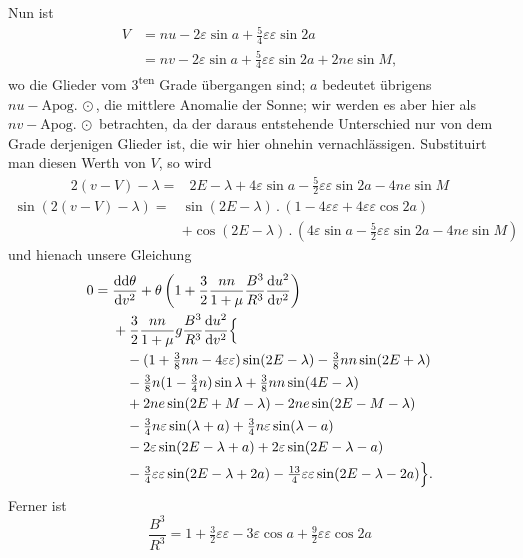 \par\noindent\hspace*{\parindent}Nun ist
\[
\begin{aligned}
V&=nu-2\varepsilon\sin a+\tfrac54\varepsilon\varepsilon\sin2a\\
 &=nv-2\varepsilon\sin a+\tfrac54\varepsilon\varepsilon\sin2a+2ne\sin M,
\end{aligned}
\]
\noindent wo die Glieder vom 3\textsuperscript{ten} Grade übergangen sind;
\(a\) bedeutet übrigens \(nu-\mathrm{Apog.}\,\odot\), die mittlere Anomalie der Sonne;
wir werden es aber hier als \(nv-\mathrm{Apog.}\,\odot\) betrachten, da der daraus
entstehende Unterschied nur von dem Grade derjenigen Glieder ist, die wir
hier ohnehin vernachlässigen. Substituirt man diesen Werth von \(V\), so wird
\[
\begin{aligned}
2(v-V)-\lambda={}&2E-\lambda+4\varepsilon\sin a
-\tfrac52\varepsilon\varepsilon\sin2a-4ne\sin M
\end{aligned}
\]
\[
\begin{aligned}
\sin(2(v-V)-\lambda)={}&\sin(2E-\lambda)\mathbin{.}
(1-4\varepsilon\varepsilon+4\varepsilon\varepsilon\cos2a)\\
&+\cos(2E-\lambda)\mathbin{.}
(4\varepsilon\sin a-\tfrac52\varepsilon\varepsilon\sin2a-4ne\sin M)
\end{aligned}
\]
\noindent und hienach unsere Gleichung
\[
\begin{aligned}
0={}&\frac{\mathrm{dd}\theta}{\mathrm{d}v^2}
+\theta\left(1+\frac32\frac{nn}{1+\mu}\frac{B^3}{R^3}
\frac{\mathrm{d}u^2}{\mathrm{d}v^2}\right)\\
&+\frac32\frac{nn}{1+\mu}g\frac{B^3}{R^3}\frac{\mathrm{d}u^2}{\mathrm{d}v^2}\Bigl\{\\
&\quad -(1+\tfrac38nn-4\varepsilon\varepsilon)\sin(2E-\lambda)
-\tfrac38nn\sin(2E+\lambda)\\
&\quad -\tfrac38n(1-\tfrac34n)\sin\lambda+\tfrac38nn\sin(4E-\lambda)\\
&\quad +2ne\sin(2E+M-\lambda)-2ne\sin(2E-M-\lambda)\\
&\quad -\tfrac34n\varepsilon\sin(\lambda+a)+\tfrac34n\varepsilon\sin(\lambda-a)\\
&\quad -2\varepsilon\sin(2E-\lambda+a)+2\varepsilon\sin(2E-\lambda-a)\\
&\quad -\tfrac34\varepsilon\varepsilon\sin(2E-\lambda+2a)
-\tfrac{13}{4}\varepsilon\varepsilon\sin(2E-\lambda-2a)\Bigr\}.
\end{aligned}
\]
\noindent Ferner ist
\[
\frac{B^3}{R^3}=1+\tfrac32\varepsilon\varepsilon-3\varepsilon\cos a
+\tfrac92\varepsilon\varepsilon\cos2a
\]
